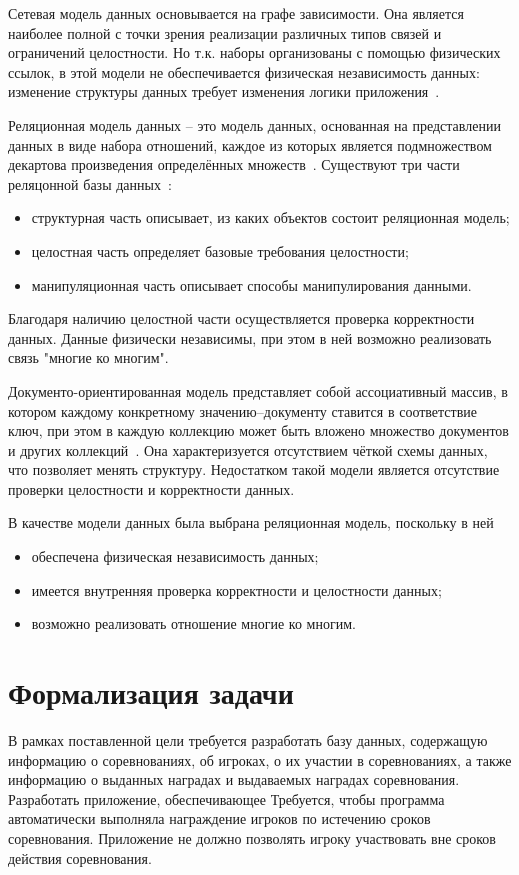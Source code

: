Сетевая модель данных основывается на графе зависимости. Она является наиболее полной с точки зрения реализации различных типов связей и ограничений целостности. Но т.к. наборы организованы с помощью физических ссылок, в этой модели не обеспечивается физическая независимость данных: изменение структуры данных требует изменения логики приложения~\cite{karpova}.

Реляционная модель данных – это модель данных, основанная на 
представлении данных в виде набора отношений, каждое из которых является 
подмножеством декартова произведения определённых множеств~\cite{karpova}. Существуют три части реляцонной базы данных~\cite{relationdb}:
\begin{itemize}
	\item структурная часть описывает, из каких объектов состоит реляционная модель;
	\item целостная часть определяет базовые требования целостности;
	\item манипуляционная часть описывает способы манипулирования данными.
\end{itemize}
Благодаря наличию целостной части осуществляется проверка корректности данных. Данные физически независимы, при этом в ней возможно реализовать связь "многие ко многим".

Документо-ориентированная модель представляет собой ассоциативный массив, в котором каждому конкретному значению--документу ставится в соответствие ключ, при этом в каждую коллекцию может быть вложено множество документов и других коллекций~\cite{documentoriented}. Она характеризуется отсутствием чёткой схемы данных, что позволяет менять структуру. Недостатком такой модели является отсутствие проверки целостности и корректности данных.

В качестве модели данных была выбрана реляционная модель, поскольку в ней
\begin{itemize}
	\item обеспечена физическая независимость данных;
	\item имеется внутренняя проверка корректности и целостности данных;
	\item возможно реализовать отношение многие ко многим.
\end{itemize} 

\section{Формализация задачи}

В рамках поставленной цели требуется разработать базу данных, содержащую информацию о соревнованиях, об игроках, о их участии в соревнованиях, а также информацию о выданных наградах и выдаваемых наградах соревнования. Разработать приложение, обеспечивающее  Требуется, чтобы программа автоматически выполняла награждение игроков по истечению сроков соревнования. Приложение не должно позволять игроку участвовать вне сроков действия соревнования. 

